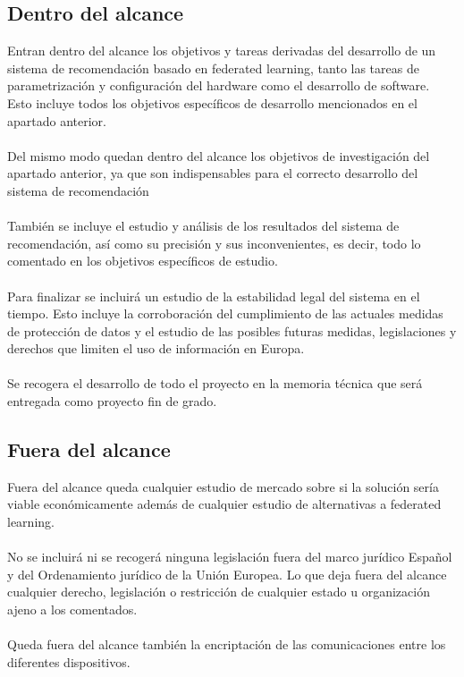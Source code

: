 \subsection{Dentro del alcance}
Entran dentro del alcance los objetivos y tareas derivadas del desarrollo de un sistema de recomendación basado en federated learning, tanto las tareas de parametrización y configuración del hardware como el desarrollo de software. Esto incluye todos los objetivos específicos de desarrollo mencionados en el apartado anterior.
\\ \\
Del mismo modo quedan dentro del alcance los objetivos de investigación del apartado anterior, ya que son indispensables para el correcto desarrollo del sistema de recomendación
\\ \\
También se incluye el estudio y análisis de los resultados del sistema de recomendación, así como su precisión y sus inconvenientes, es decir, todo lo comentado en los objetivos específicos de estudio.
\\ \\
Para finalizar se incluirá un estudio de la estabilidad legal del sistema en el tiempo. Esto incluye la corroboración del cumplimiento de las actuales medidas de protección de datos y el estudio de las posibles futuras medidas, legislaciones y derechos que limiten el uso de información en Europa.
\\ \\
Se recogera el desarrollo de todo el proyecto en la memoria técnica que será entregada como proyecto fin de grado.

\subsection{Fuera del alcance}
Fuera del alcance queda cualquier estudio de mercado sobre si la solución sería viable económicamente además de cualquier estudio de alternativas a federated learning. 
\\ \\
No se incluirá ni se recogerá ninguna legislación fuera del marco jurídico Español y del Ordenamiento jurídico de la Unión Europea. Lo que deja fuera del alcance cualquier derecho, legislación o restricción de cualquier estado u organización ajeno a los comentados.
\\ \\
Queda fuera del alcance también la encriptación de las comunicaciones entre los diferentes dispositivos.
\\